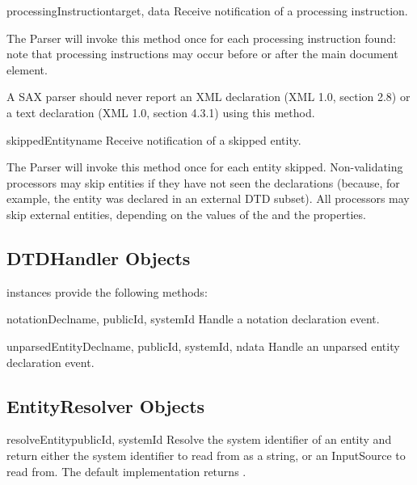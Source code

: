 \begin{methoddesc}[ContentHandler]{processingInstruction}{target, data}
  Receive notification of a processing instruction.
        
  The Parser will invoke this method once for each processing
  instruction found: note that processing instructions may occur
  before or after the main document element.

  A SAX parser should never report an XML declaration (XML 1.0,
  section 2.8) or a text declaration (XML 1.0, section 4.3.1) using
  this method.
\end{methoddesc}

\begin{methoddesc}[ContentHandler]{skippedEntity}{name}
  Receive notification of a skipped entity.
        
  The Parser will invoke this method once for each entity
  skipped. Non-validating processors may skip entities if they have
  not seen the declarations (because, for example, the entity was
  declared in an external DTD subset). All processors may skip
  external entities, depending on the values of the
   and the
   properties.
\end{methoddesc}


\subsection{DTDHandler Objects \label{dtd-handler-objects}}

 instances provide the following methods:

\begin{methoddesc}[DTDHandler]{notationDecl}{name, publicId, systemId}
  Handle a notation declaration event.
\end{methoddesc}

\begin{methoddesc}[DTDHandler]{unparsedEntityDecl}{name, publicId,
                                                   systemId, ndata}
  Handle an unparsed entity declaration event.
\end{methoddesc}


\subsection{EntityResolver Objects \label{entity-resolver-objects}}

\begin{methoddesc}[EntityResolver]{resolveEntity}{publicId, systemId}
  Resolve the system identifier of an entity and return either the
  system identifier to read from as a string, or an InputSource to
  read from. The default implementation returns .
\end{methoddesc}


